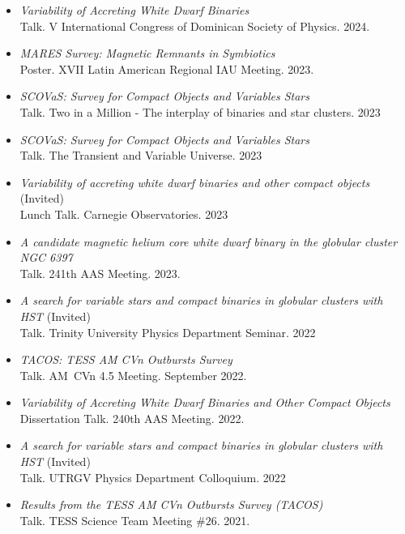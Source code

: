 \documentclass[letterpaper,10pt]{article}
\begin{document}
\begin{itemize}[label=$\blacktriangleright$]
\item \textit{Variability of Accreting White Dwarf Binaries} \\ Talk. V International Congress of Dominican Society of Physics. 2024.


\item \textit{MARES Survey: Magnetic Remnants in Symbiotics} \\ Poster. XVII Latin American Regional IAU Meeting. 2023.

\item \textit{ SCOVaS: Survey for Compact Objects and Variables Stars}  \\ Talk. Two in a Million - The interplay of binaries and star clusters. 2023


\item \textit{ SCOVaS: Survey for Compact Objects and Variables Stars}  \\ Talk. The Transient and Variable Universe. 2023


\item \textit{ Variability of accreting white dwarf binaries and other compact objects }  (Invited) \\ Lunch Talk. Carnegie Observatories. 2023

\item \textit{A candidate magnetic helium core white dwarf binary in the globular cluster NGC 6397} \\ Talk. 241th AAS Meeting. 2023.

\item \emph{A search for variable stars and compact binaries in globular clusters with HST} (Invited)\\
Talk. Trinity University Physics Department Seminar. 2022

\item \textit{TACOS: TESS AM CVn Outbursts Survey} \\ Talk. AM~CVn 4.5 Meeting. September 2022.

\item \textit{Variability of Accreting White Dwarf Binaries and Other Compact Objects} \\ Dissertation Talk. 240th AAS Meeting. 2022.


\item \emph{A search for variable stars and compact binaries in globular clusters with HST} (Invited)\\
Talk. UTRGV Physics Department Colloquium. 2022


\item \textit{Results from the TESS AM CVn Outbursts Survey (TACOS)} \\ Talk. TESS Science Team Meeting $\#26$. 2021.



\end{itemize}
\end{document}

